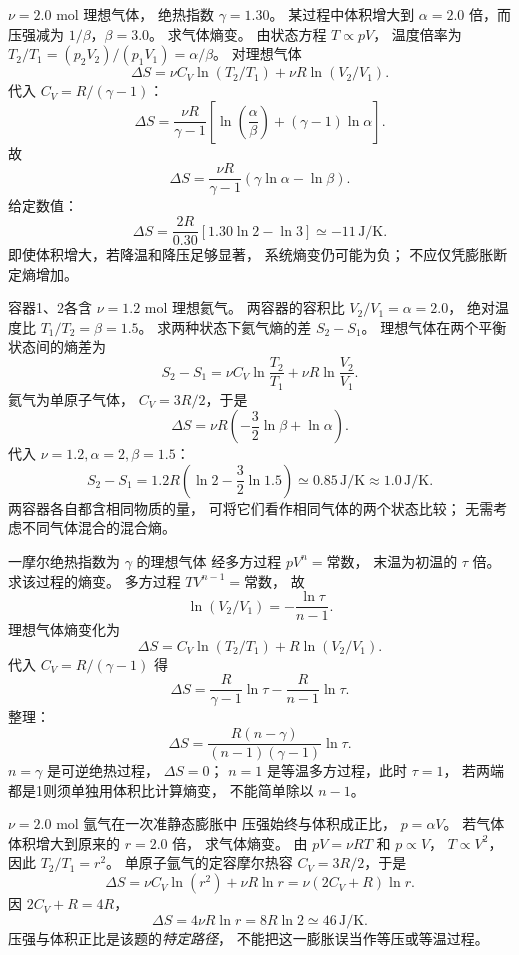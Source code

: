 $\nu=2.0$ mol 理想气体，
绝热指数 $\gamma=1.30$。
某过程中体积增大到
$\alpha=2.0$ 倍，而压强减为
$1/\beta$，$\beta=3.0$。
求气体熵变。
\exsolution
由状态方程
$T\propto pV$，
温度倍率为
$T_2/T_1=(p_2V_2)/(p_1V_1)=\alpha/\beta$。
对理想气体
\[
\Delta S=\nu C_V\ln(T_2/T_1)
+\nu R\ln(V_2/V_1).
\]
代入 $C_V=R/(\gamma-1)$：
\[
\Delta S=\frac{\nu R}{\gamma-1}
\left[\ln\left(\frac\alpha\beta\right)
+(\gamma-1)\ln\alpha\right].
\]
故
\[
\boxed{\Delta S=
\frac{\nu R}{\gamma-1}
\left(\gamma\ln\alpha-\ln\beta\right)}.
\]
给定数值：
\[
\boxed{\Delta S=
\frac{2R}{0.30}
[1.30\ln2-\ln3]\simeq-11\,\mathrm{J/K}}.
\]
\excheck 即使体积增大，若降温和降压足够显著，
系统熵变仍可能为负；
不应仅凭膨胀断定熵增加。

容器1、2各含
$\nu=1.2$ mol 理想氦气。
两容器的容积比
$V_2/V_1=\alpha=2.0$，
绝对温度比
$T_1/T_2=\beta=1.5$。
求两种状态下氦气熵的差
$S_2-S_1$。
\exsolution
理想气体在两个平衡状态间的熵差为
\[
S_2-S_1=
\nu C_V\ln\frac{T_2}{T_1}
+\nu R\ln\frac{V_2}{V_1}.
\]
氦气为单原子气体，
$C_V=3R/2$，于是
\[
\Delta S=\nu R
\left(-\frac32\ln\beta+\ln\alpha\right).
\]
代入
$\nu=1.2,\alpha=2,\beta=1.5$：
\[
\boxed{S_2-S_1=
1.2R\left(\ln2-\frac32\ln1.5\right)
\simeq0.85\,\mathrm{J/K}\approx1.0\,\mathrm{J/K}}.
\]
\excheck 两容器各自都含相同物质的量，
可将它们看作相同气体的两个状态比较；
无需考虑不同气体混合的混合熵。

一摩尔绝热指数为 $\gamma$ 的理想气体
经多方过程 $pV^n=\text{常数}$，
末温为初温的 $\tau$ 倍。
求该过程的熵变。
\exsolution
多方过程
$TV^{n-1}=\text{常数}$，
故
\[
\ln(V_2/V_1)=-\frac{\ln\tau}{n-1}.
\]
理想气体熵变化为
\[
\Delta S=C_V\ln(T_2/T_1)
+R\ln(V_2/V_1).
\]
代入 $C_V=R/(\gamma-1)$ 得
\[
\Delta S=\frac R{\gamma-1}\ln\tau
-\frac R{n-1}\ln\tau.
\]
整理：
\[
\boxed{\Delta S=
\frac{R(n-\gamma)}{(n-1)(\gamma-1)}
\ln\tau}.
\]
\excheck $n=\gamma$ 是可逆绝热过程，
$\Delta S=0$；
$n=1$ 是等温多方过程，此时 $\tau=1$，
若两端都是1则须单独用体积比计算熵变，
不能简单除以 $n-1$。

$\nu=2.0$ mol 氩气在一次准静态膨胀中
压强始终与体积成正比，
$p=\alpha V$。
若气体体积增大到原来的
$r=2.0$ 倍，
求气体熵变。
\exsolution
由 $pV=\nu RT$ 和
$p\propto V$，
$T\propto V^2$，
因此
$T_2/T_1=r^2$。
单原子氩气的定容摩尔热容
$C_V=3R/2$，于是
\[
\Delta S=\nu C_V\ln(r^2)+\nu R\ln r
=\nu(2C_V+R)\ln r.
\]
因 $2C_V+R=4R$，
\[
\boxed{\Delta S=4\nu R\ln r
=8R\ln2\simeq46\,\mathrm{J/K}}.
\]
\excheck 压强与体积正比是该题的\emph{特定路径}，
不能把这一膨胀误当作等压或等温过程。

